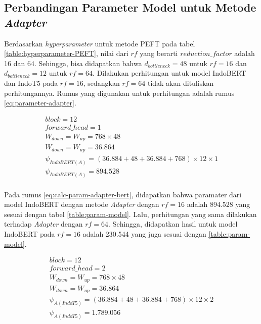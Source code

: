 \subsection{Perbandingan Parameter Model untuk Metode \textit{Adapter}}

Berdasarkan \textit{hyperparameter} untuk metode PEFT pada tabel \ref{table:hyperparameter-PEFT}, nilai dari $rf$ yang berarti $reduction\_factor$ adalah 16 dan 64. Sehingga, bisa didapatkan bahwa $d_{bottleneck}=48$ untuk $rf=16$ dan $d_{bottleneck}=12$ untuk $rf=64$. Dilakukan perhitungan untuk model IndoBERT dan IndoT5 pada $rf=16$, sedangkan $rf=64$ tidak akan dituliskan perhitungannya. Rumus yang digunakan untuk perhitungan adalah rumus \ref{eq:parameter-adapter}.

\begin{equation}
    \begin{aligned}
        block = 12 \\ 
        forward\_head = 1 \\
        W_{down} = W_{up} = 768 \times 48 \\
        W_{down} = W_{up} = 36.864 \\
        \psi_{IndoBERT(A)} = (36.884 + 48 + 36.884 + 768) \times 12 \times 1 \\
        \psi_{IndoBERT(A)} = 894.528 \\
    \end{aligned}
    \label{eq:calc-param-adapter-bert}
\end{equation}

Pada rumus \ref{eq:calc-param-adapter-bert}, didapatkan bahwa paramater dari model IndoBERT dengan metode \textit{Adapter} dengan $rf=16$ adalah 894.528 yang sesuai dengan tabel \ref{table:param-model}. Lalu, perhitungan yang sama dilakukan terhadap \textit{Adapter} dengan $rf=64$. Sehingga, didapatkan hasil untuk model IndoBERT pada $rf=16$ adalah 230.544 yang juga sesuai dengan \ref{table:param-model}. 

\begin{equation}
    \begin{aligned}
        block = 12 \\ 
        forward\_head = 2 \\
        W_{down} = W_{up} = 768 \times 48 \\
        W_{down} = W_{up} = 36.864 \\
        \psi_{A(IndoT5)} = (36.884 + 48 + 36.884 + 768) \times 12 \times 2 \\
        \psi_{A(IndoT5)} = 1.789.056 \\
    \end{aligned}
    \label{eq:calc-param-adapter-t5}
\end{equation}

